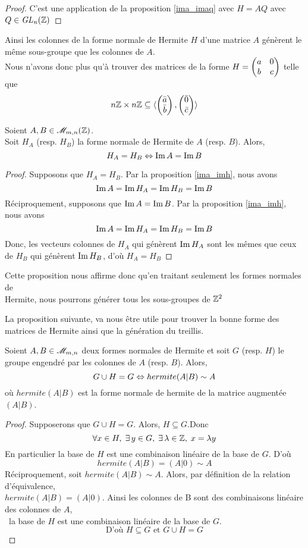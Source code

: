 \documentclass[12pt]{article}
\begin{document}
\begin{proof}
	C'est une application de la proposition \ref{ima_imaq} avec $H= AQ$ avec $Q \in \it {GL}_n(\mathbb Z)$

\end{proof}

Ainsi les colonnes de la forme normale de Hermite $H$ d'une matrice $A$ génèrent le même
sous-groupe que les colonnes de $A$.\\
Nous n'avons donc plus qu'à trouver des matrices de la forme
$H = \begin{pmatrix} a & 0\\ b & c \end{pmatrix}$ telle que
$$n\mathbb Z \times n\mathbb Z \subseteq \langle \begin{pmatrix} \bar a\\ \bar b \end{pmatrix},\begin{pmatrix} \bar 0\\ \bar c \end{pmatrix} \rangle$$

\begin{proposition}\label{ha_hb_ssi_ima_imb}
	Soient $A,B \in \mathscr{M}_{m,n}(\mathbb Z)$.\\
	Soit $H_A$ (resp. $H_B$) la forme normale de Hermite de $A$ (resp. $B$). Alors,
	$$ H_A = H_B \Leftrightarrow \operatorname{Im} A = \operatorname{Im} B$$
\end{proposition}

\begin{proof}
	Supposons que $H_A = H_B$.	Par la proposition \ref{ima_imh}, nous avons
	$$\operatorname{Im} A = \operatorname{Im} H_A = \operatorname{Im} H_B = \operatorname{Im} B$$
	Réciproquement, supposons que $\operatorname{Im} A = \operatorname{Im} B$. Par la proposition \ref{ima_imh}, nous avons
	$$\operatorname{Im} A = \operatorname{Im} H_A = \operatorname{Im} H_B = \operatorname{Im} B$$
	Donc, les vecteurs colonnes de $H_A$ qui génèrent $\operatorname{Im} H_A$ sont les mêmes que ceux de
	$H_B$ qui génèrent $\operatorname{Im} H_B$, d'où $H_A = H_B$

\end{proof}

\newpage
Cette proposition nous affirme donc qu'en traitant seulement les formes normales de \\
Hermite, nous pourrons générer tous les sous-groupes de $\mathbb Z^2$

La proposition suivante, va nous être utile pour trouver la bonne forme des matrices de Hermite
ainsi que la génération du treillis.

\begin{proposition}\label{guh_g_ssi_a_sim_b}
	Soient $A,B \in \mathscr{M}_{m,n}$ deux formes normales de Hermite et soit $G$ (resp. $H$) le
	groupe engendré par les colonnes de $A$ (resp. $B$). Alors,
	$$G \cup H = G \Leftrightarrow hermite(A | B) \sim A$$
	où $hermite(A|B)$ est la forme normale de hermite de la matrice augmentée $(A | B)$.
\end{proposition}

\begin{proof}
	Supposerons que $G \cup H = G$. Alors, $ H \subseteq G$.Donc
	$$\forall x \in H , \;  \exists \, y \in G , \; \exists \, \lambda \in \mathbb Z , \; x = \lambda y$$
	En particulier la base de $H$ est une combinaison linéaire de la base de $G$. D'où
	$$hermite(A | B) = (A | 0) \sim A$$
	\noindent
	Réciproquement, soit $hermite(A | B) \sim A$. Alors, par définition de la relation
	d'équivalence,\\
	$hermite(A | B) = (A | 0)$. Ainsi les colonnes de B sont des combinaisons linéaire des
	colonnes de $A$,\\
	\cad \, la base de $H$ est une combinaison linéaire de la base de $G$.
	$$\text{D'où } H \subseteq G \text{ et } G \cup H = G$$
\end{proof}
\end{document}
